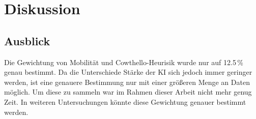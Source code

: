 
\chapter{Diskussion}
\label{chap:diskussion}

\section{Ausblick}
Die Gewichtung von Mobilität und Cowthello-Heurisik wurde nur auf 12.5\,\% genau bestimmt. Da die Unterschiede Stärke
der KI sich jedoch immer geringer werden, ist eine genauere Bestimmung nur mit einer größeren Menge an Daten möglich. Um
diese zu sammeln war im Rahmen dieser Arbeit nicht mehr genug Zeit. In weiteren Untersuchungen könnte diese Gewichtung
genauer bestimmt werden.
